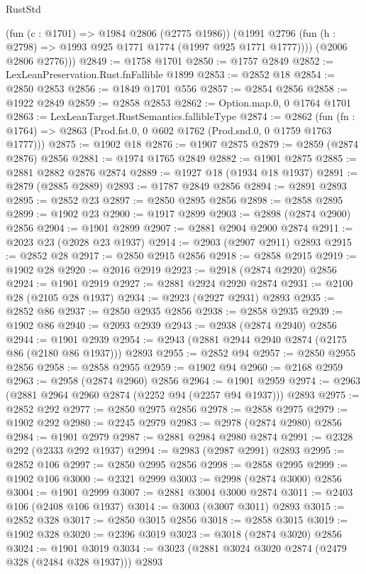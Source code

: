 \begin{lexlean}{RustStd}
\begin{coremodule}
          (fun (c : @1701) => @1984 @2806 (@2775 @1986))
          (@1991 @2796 (fun (h : @2798) => @1993 @925 @1771 @1774 (@1997 @925 @1771 @1777))))
        (@2006 @2806 @2776)))
@2849 := @1758 @1701
@2850 := @1757 @2849
@2852 := LexLeanPreservation.Rust.fnFallible @1899
@2853 := @2852 @18
@2854 := @2850 @2853
@2856 := @1849 @1701 @556
@2857 := @2854 @2856
@2858 := @1922 @2849
@2859 := @2858 @2853
@2862 := Option.map.{0, 0} @1764 @1701
@2863 := LexLeanTarget.RustSemantics.fallibleType
@2874 := @2862
    (fun (fn : @1764) => @2863 (Prod.fst.{0, 0} @602 @1762 (Prod.snd.{0, 0} @1759 @1763 @1777)))
@2875 := @1902 @18
@2876 := @1907 @2875
@2879 := @2859 (@2874 @2876) @2856
@2881 := @1974 @1765 @2849
@2882 := @1901 @2875
@2885 := @2881 @2882 @2876 @2874
@2889 := @1927 @18 (@1934 @18 @1937)
@2891 := @2879 (@2885 @2889)
@2893 := @1787 @2849 @2856
@2894 := @2891 @2893
@2895 := @2852 @23
@2897 := @2850 @2895 @2856
@2898 := @2858 @2895
@2899 := @1902 @23
@2900 := @1917 @2899
@2903 := @2898 (@2874 @2900) @2856
@2904 := @1901 @2899
@2907 := @2881 @2904 @2900 @2874
@2911 := @2023 @23 (@2028 @23 @1937)
@2914 := @2903 (@2907 @2911) @2893
@2915 := @2852 @28
@2917 := @2850 @2915 @2856
@2918 := @2858 @2915
@2919 := @1902 @28
@2920 := @2016 @2919
@2923 := @2918 (@2874 @2920) @2856
@2924 := @1901 @2919
@2927 := @2881 @2924 @2920 @2874
@2931 := @2100 @28 (@2105 @28 @1937)
@2934 := @2923 (@2927 @2931) @2893
@2935 := @2852 @86
@2937 := @2850 @2935 @2856
@2938 := @2858 @2935
@2939 := @1902 @86
@2940 := @2093 @2939
@2943 := @2938 (@2874 @2940) @2856
@2944 := @1901 @2939
@2954 := @2943 (@2881 @2944 @2940 @2874 (@2175 @86 (@2180 @86 @1937))) @2893
@2955 := @2852 @94
@2957 := @2850 @2955 @2856
@2958 := @2858 @2955
@2959 := @1902 @94
@2960 := @2168 @2959
@2963 := @2958 (@2874 @2960) @2856
@2964 := @1901 @2959
@2974 := @2963 (@2881 @2964 @2960 @2874 (@2252 @94 (@2257 @94 @1937))) @2893
@2975 := @2852 @292
@2977 := @2850 @2975 @2856
@2978 := @2858 @2975
@2979 := @1902 @292
@2980 := @2245 @2979
@2983 := @2978 (@2874 @2980) @2856
@2984 := @1901 @2979
@2987 := @2881 @2984 @2980 @2874
@2991 := @2328 @292 (@2333 @292 @1937)
@2994 := @2983 (@2987 @2991) @2893
@2995 := @2852 @106
@2997 := @2850 @2995 @2856
@2998 := @2858 @2995
@2999 := @1902 @106
@3000 := @2321 @2999
@3003 := @2998 (@2874 @3000) @2856
@3004 := @1901 @2999
@3007 := @2881 @3004 @3000 @2874
@3011 := @2403 @106 (@2408 @106 @1937)
@3014 := @3003 (@3007 @3011) @2893
@3015 := @2852 @328
@3017 := @2850 @3015 @2856
@3018 := @2858 @3015
@3019 := @1902 @328
@3020 := @2396 @3019
@3023 := @3018 (@2874 @3020) @2856
@3024 := @1901 @3019
@3034 := @3023 (@2881 @3024 @3020 @2874 (@2479 @328 (@2484 @328 @1937))) @2893

\end{coremodule}
\end{lexlean}
